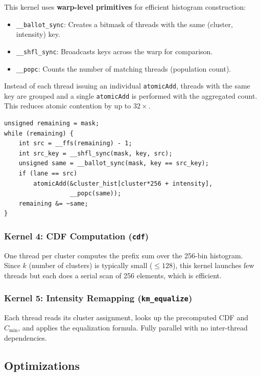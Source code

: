 \documentclass[11pt,a4paper]{article}
\begin{document}
This kernel uses \textbf{warp-level primitives} for efficient histogram construction:

\begin{itemize}
    \item \texttt{\_\_ballot\_sync}: Creates a bitmask of threads with the same (cluster, intensity) key.
    \item \texttt{\_\_shfl\_sync}: Broadcasts keys across the warp for comparison.
    \item \texttt{\_\_popc}: Counts the number of matching threads (population count).
\end{itemize}

Instead of each thread issuing an individual \texttt{atomicAdd}, threads with the same key are grouped and a single \texttt{atomicAdd} is performed with the aggregated count. This reduces atomic contention by up to $32\times$.

\begin{lstlisting}[caption={Warp-level histogram aggregation}]
unsigned remaining = mask;
while (remaining) {
    int src = __ffs(remaining) - 1;
    int src_key = __shfl_sync(mask, key, src);
    unsigned same = __ballot_sync(mask, key == src_key);
    if (lane == src)
        atomicAdd(&cluster_hist[cluster*256 + intensity],
                  __popc(same));
    remaining &= ~same;
}
\end{lstlisting}

\subsubsection{Kernel 4: CDF Computation (\texttt{cdf})}

One thread per cluster computes the prefix sum over the 256-bin histogram. Since $k$ (number of clusters) is typically small ($\leq 128$), this kernel launches few threads but each does a serial scan of 256 elements, which is efficient.

\subsubsection{Kernel 5: Intensity Remapping (\texttt{km\_equalize})}

Each thread reads its cluster assignment, looks up the precomputed CDF and $C_{\min}$, and applies the equalization formula. Fully parallel with no inter-thread dependencies.

\subsection{Optimizations}
\end{document}
